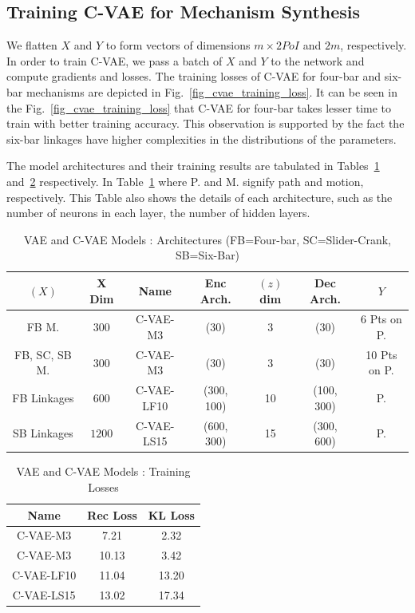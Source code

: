 \subsection{Training C-VAE for Mechanism Synthesis}

We flatten $X$ and $Y$ to form vectors of dimensions $m \times 2 PoI$ and $2m$, respectively.
In order to train C-VAE, we pass a batch of $X$ and $Y$ to the network and compute gradients and losses.
The training losses of C-VAE for four-bar and six-bar mechanisms are depicted in Fig.~\ref{fig_cvae_training_loss}.
It can be seen in the Fig.~\ref{fig_cvae_training_loss} that C-VAE for four-bar takes lesser time to train with better training accuracy.
This observation is supported by the fact the six-bar linkages have higher complexities in the distributions of the parameters.

The model architectures and their training results are tabulated in Tables~\ref{tab_cvae_model} and~\ref{tab_cvae_model1} respectively. In Table~\ref{tab_cvae_model} where P. and M. signify path and motion, respectively. This Table also shows the details of each architecture, such as the number of neurons in each layer, the number of hidden layers.

\begin{table}
  \caption{VAE and C-VAE Models : Architectures (FB=Four-bar, SC=Slider-Crank, SB=Six-Bar)}
\centering
\label{tab_cvae_model}
\begin{tabular}{ccccccc}
\hline
  $(X)$ & X Dim & Name & Enc Arch. & $(z)$ dim  & Dec Arch. & $Y$ \\
\hline
  FB M. & $300$ & C-VAE-M3 & (30) & 3 & (30) & 6 Pts on P. \\
  FB, SC, SB M. & $300$ & C-VAE-M3 & (30) & 3 & (30) & 10 Pts on P.  \\
  FB Linkages & $600$ & C-VAE-LF10 & (300, 100) & 10 & (100, 300) & P. \\
  SB Linkages & $1200$ & C-VAE-LS15 & (600, 300) & 15 & (300, 600) & P. \\
\end{tabular}
\end{table}

\begin{table}
  \caption{VAE and C-VAE Models : Training Losses}
\centering
\label{tab_cvae_model1}
\begin{tabular}{ccc}
\hline
  Name & Rec Loss & KL Loss \\
\hline
   C-VAE-M3   & 7.21 & 2.32 \\
   C-VAE-M3   & 10.13 & 3.42 \\
   C-VAE-LF10 & 11.04 & 13.20 \\
   C-VAE-LS15 & 13.02 & 17.34 \\
\end{tabular}
\end{table}




